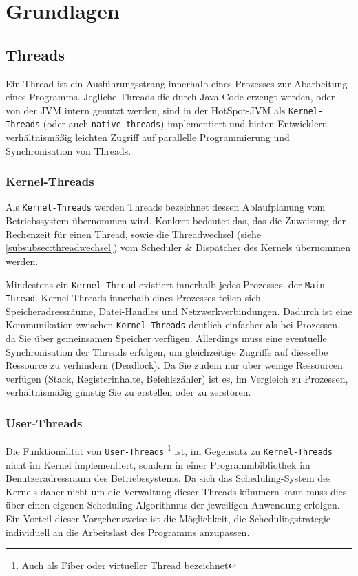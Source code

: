 \section{Grundlagen}
\label{sec:grundlagen}

\subsection{Threads}
\label{subsec:threads}
Ein Thread ist ein Ausführungsstrang innerhalb eines Prozesses zur Abarbeitung eines Programms.
Jegliche Threads die durch Java-Code erzeugt werden, oder von der JVM intern genutzt werden,
sind in der HotSpot-JVM als \verb|Kernel-Threads| (oder auch \verb|native threads|) implementiert
und bieten Entwicklern verhältnismäßig leichten Zugriff auf parallelle Programmierung und Synchronisation von Threads.
\parencite[Absatz Thread Management]{OpenJDKHotspotOverview}

\subsubsection{Kernel-Threads}
\label{subsubsec:kernel-threads}
Als \verb|Kernel-Threads| werden Threads bezeichnet dessen Ablaufplanung vom Betriebssystem übernommen wird.
Konkret bedeutet das, das die Zuweisung der Rechenzeit für einen Thread, sowie die Threadwechsel (siehe \ref{subsubsec:threadwechsel})
vom Scheduler \& Dispatcher des Kernels übernommen werden.

Mindestens ein \verb|Kernel-Thread| existiert innerhalb jedes Prozesses, der \verb|Main-Thread|. Kernel-Threads innerhalb eines Prozesses
teilen sich Speicheradressräume, Datei-Handles und Netzwerkverbindungen. Dadurch ist eine Kommunikation zwischen \verb|Kernel-Threads| deutlich
einfacher als bei Prozessen, da Sie über gemeinsamen Speicher verfügen. Allerdings muss eine eventuelle Synchronisation der Threads erfolgen, um
gleichzeitige Zugriffe auf diesselbe Ressource zu verhindern (Deadlock).
Da Sie zudem nur über wenige Ressourcen verfügen (Stack, Registerinhalte, Befehlszähler) ist es, im Vergleich zu Prozessen,
verhältnismäßig günstig Sie zu erstellen oder zu zerstören. \parencite[Kapitel 2.2.5]{Tanenbaum2016}\parencite{Brosenne2021}

\subsubsection{User-Threads}
\label{subsubsec:user-threads}
Die Funktionalität von \verb|User-Threads| \footnote{Auch als Fiber oder virtueller Thread bezeichnet} ist, im Gegensatz zu \verb|Kernel-Threads|
nicht im Kernel implementiert, sondern in einer Programmbibliothek im Benutzeradressraum des Betriebssystems.
Da sich das Scheduling-System des Kernels daher nicht um die Verwaltung dieser Threads kümmern kann muss dies über einen eigenen Scheduling-Algorithmus
der jeweiligen Anwendung erfolgen.
Ein Vorteil dieser Vorgehensweise ist die Möglichkeit, die Schedulingstrategie individuell an die Arbeitslast des Programms anzupassen.

